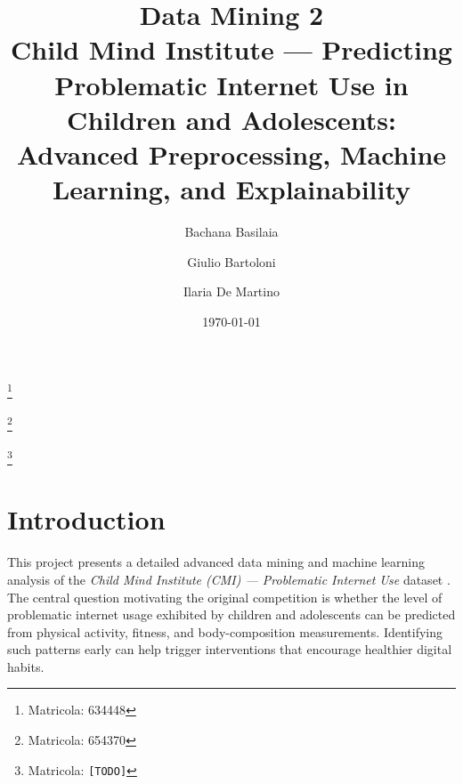 

\newcommand{\imgph}[1]{%
  \fbox{\parbox[c][5.4cm][c]{0.92\linewidth}{\centering\footnotesize\ttfamily [IMAGE PLACEHOLDER:\\[2pt] #1]}}%
}



\title{Data Mining 2 \\ Child Mind Institute --- Predicting Problematic Internet Use in Children and Adolescents: Advanced Preprocessing, Machine Learning, and Explainability}

\author{Bachana Basilaia}
\thanks{Matricola: 634448}
\author{Giulio Bartoloni}
\thanks{Matricola: 654370}
\author{Ilaria De Martino}
\thanks{Matricola: \texttt{[TODO]}}

\date{\today}

\maketitle

\onecolumngrid
\tableofcontents
\clearpage
\twocolumngrid


\section{Introduction}

This project presents a detailed advanced data mining and machine learning analysis of the \emph{Child Mind Institute (CMI) --- Problematic Internet Use} dataset \cite{cmi}. The central question motivating the original competition is whether the level of problematic internet usage exhibited by children and adolescents can be predicted from physical activity, fitness, and body-composition measurements. Identifying such patterns early can help trigger interventions that encourage healthier digital habits.\\


